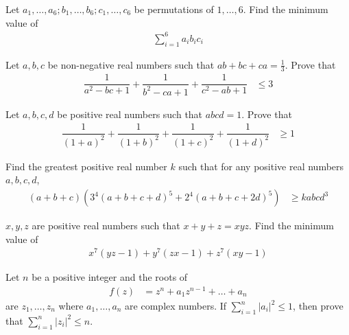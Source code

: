 \documentclass{subfile}
\begin{document}
		\begin{problem}
			Let $a_{1},\ldots,a_{6};b_{1},\ldots,b_{6};c_{1},\ldots,c_{6}$ be permutations of $1,\ldots,6$. Find the minimum value of
				\begin{align*}
					\sum_{i=1}^{6}a_{i}b_{i}c_{i}
				\end{align*}
		\end{problem}
	
		\begin{problem}
			Let $a,b,c$ be non-negative real numbers such that $ab+bc+ca=\frac{1}{3}$. Prove that
				\begin{align*}
					\dfrac{1}{a^{2}-bc+1}+\dfrac{1}{b^{2}-ca+1}+\dfrac{1}{c^{2}-ab+1}
						& \leq 3
				\end{align*}
		\end{problem}
	
		\begin{problem}
			Let $a,b,c,d$ be positive real numbers such that $abcd=1$. Prove that
				\begin{align*}
					\dfrac{1}{(1+a)^{2}}+\dfrac{1}{(1+b)^{2}}+\dfrac{1}{(1+c)^{2}}+\dfrac{1}{(1+d)^{2}}
						& \geq 1
				\end{align*}
		\end{problem}
	
		\begin{problem}
			Find the greatest positive real number $k$ such that for any positive real numbers $a,b,c,d$,
				\begin{align*}
					(a+b+c)\left(3^{4}(a+b+c+d)^{5}+2^{4}(a+b+c+2d)^{5}\right)
						& \geq kabcd^{3}
				\end{align*}
		\end{problem}
	
		\begin{problem}
			$x,y,z$ are positive real numbers such that $x+y+z=xyz$. Find the minimum value of
				\begin{align*}
					x^{7}(yz-1)+y^{7}(zx-1)+z^{7}(xy-1)
				\end{align*}
		\end{problem}
	
		\begin{problem}
			Let $n$ be a positive integer and the roots of
				\begin{align*}
					f(z)
						& = z^{n}+a_{1}z^{n-1}+\ldots+a_{n}
				\end{align*}
			are $z_{1},\ldots,z_{n}$ where $a_{1},\ldots,a_{n}$ are complex numbers. If $\sum_{i=1}^{n}|a_{i}|^{2}\leq 1$, then prove that $\sum_{i=1}^{n}|z_{i}|^{2}\leq n$.
		\end{problem}
	
\end{document}
